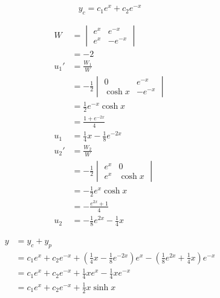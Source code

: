 \documentclass{article}
\begin{document}
\[y_c = c_1 e^x + c_2 e^{-x}\]

\begin{align*}
  W    & = \begin{vmatrix}
             e^x & e^{-x}  \\
             e^x & -e^{-x}
           \end{vmatrix}                      \\
       & = -2                                  \\
  u_1' & = \frac{W_1}{W}                       \\
       & = -\frac{1}{2} \begin{vmatrix}
                          0       & e^{-x}  \\
                          \cosh x & -e^{-x}
                        \end{vmatrix}      \\
       & = \frac{1}{2} e^{-x} \cosh x          \\
       & = \frac{1 + e^{-2x}}{4}               \\
  u_1  & = \frac{1}{4} x - \frac{1}{8} e^{-2x} \\
  u_2' & = \frac{W_2}{W}                       \\
       & = -\frac{1}{2} \begin{vmatrix}
                          e^x & 0       \\
                          e^x & \cosh x
                        \end{vmatrix}         \\
       & = -\frac{1}{2} e^x \cosh x            \\
       & = -\frac{e^{2x} + 1}{4}               \\
  u_2  & = -\frac{1}{8} e^{2x} - \frac{1}{4} x
\end{align*}

\begin{align*}
  y & = y_c + y_p                                                                                                                                \\
    & = c_1 e^x + c_2 e^{-x} + \left( \frac{1}{4} x - \frac{1}{8} e^{-2x} \right) e^x - \left( \frac{1}{8} e^{2x} + \frac{1}{4} x \right) e^{-x} \\
    & = c_1 e^x + c_2 e^{-x} + \frac{1}{4} x e^x - \frac{1}{4} x e^{-x}                                                                          \\
    & = c_1 e^x + c_2 e^{-x} + \frac{1}{2} x \sinh x
\end{align*}
\end{document}
